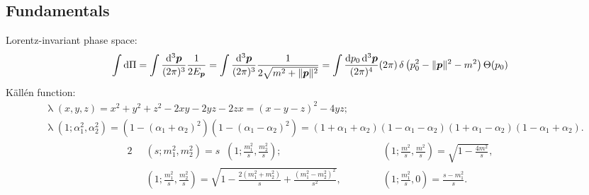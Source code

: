 \documentclass[CheatSheet]{subfiles}
\begin{document}
\detailstyle
\subsection{Fundamentals}
Lorentz-invariant phase space:
\begin{equation*}
\int\dd\Pi
= \int\ddP{p}\frac{1}{2E_{\vc p}}
= \int\ddP{p}\frac{1}{2\sqrt{m^2+\|\vc p\|^2}}
= \int\frac{\dd p_0\dd^3\vc p}{(2\pi)^4}(2\pi)\diracdelta\left(p_0^2-\|\vc p\|^2-m^2\right)\Theta(p_0)
\end{equation*}
K\"all\'en function:
\begin{align*}
&\mathop{\lambda}(x,y,z)
= x^2+y^2+z^2-2xy-2yz-2zx
= (x-y-z)^2-4yz;
\\
&
\mathop{\lambda}(1;\alpha_1^2,\alpha_2^2)
= (1-(\alpha_1+\alpha_2)^2)(1-(\alpha_1-\alpha_2)^2)
= (1+\alpha_1+\alpha_2)(1-\alpha_1-\alpha_2)(1+\alpha_1-\alpha_2)(1-\alpha_1+\alpha_2).
\end{align*}
\begin{alignat*}{2}
&\mathop{\lambda^{1/2}}\left(s;m_1^2, m_2^2\right) = s\mathop{\lambda^{1/2}}\left(1;\frac{m_1^2}{s}, \frac{m_2^2}{s}\right);&
\qquad
&\mathop{\lambda^{1/2}}\left(1;\frac{m^2}{s},\frac{m^2}{s}\right)
= \sqrt{1-\frac{4 m^2}{s}},\\
&\mathop{\lambda^{1/2}}\left(1;\frac{m_1^2}{s},\frac{m_2^2}{s}\right)
= \sqrt{1-\frac{2 (m_1^2+m_2^2)}{s}+\frac{(m_1^2-m_2^2)^2}{s^2}},&
&\mathop{\lambda^{1/2}}\left(1;\frac{m_1^2}{s},0\right)
= \frac{s-m_1^2}{s}.
\end{alignat*}
\end{document}
